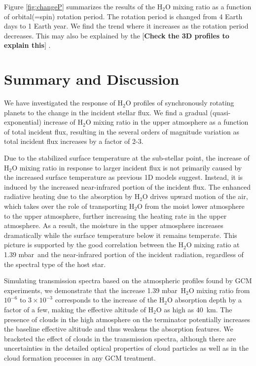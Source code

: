 \documentclass[11pt,numberedappendix,twocolappendix,]{emulateapj}
\def\water{H$_2$O }
\def\preslevel{1.39 mbar\ }
\def\memo#1{\color{red}$[${\bf #1}$]$ \color{black}}
\begin{document}
Figure \ref{fig:changeP} summarizes the results of the \water mixing ratio as a function of orbital(=spin) rotation period. 
The rotation period is changed from 4 Earth days to 1 Earth year. 
We find the trend where it increases as the rotation period decreases. 
This may also be explained by the 
\memo{Check the 3D profiles to explain this}. 



\section{Summary and Discussion}
\label{s:summary}

We have investigated the response of \water profiles of synchronously rotating planets to the change in the incident stellar flux. 
We find a gradual (quasi-exponential) increase of \water mixing ratio in the upper atmosphere as a function of total incident flux, resulting in the several orders of magnitude variation as total incident flux increases by a factor of 2-3. 

Due to the stabilized surface temperature at the sub-stellar point, the increase of \water mixing ratio in response to larger incident flux is not primarily caused by the increased surface temperature as previous 1D models suggest. 
Instead, it is induced by the increased near-infrared portion of the incident flux. 
The enhanced radiative heating due to the absorption by \water drives upward motion of the air, which takes over the role of transporting \water from the moist lower atmosphere to the upper atmosphere, further increasing the heating rate in the upper atmosphere.
As a result, the moisture in the upper atmosphere increases dramatically while the surface temperature below it remains temperate. 
This picture is supported by the good correlation between the \water mixing ratio at \preslevel and the near-infrared portion of the incident radiation, regardless of the spectral type of the host star. 

Simulating transmission spectra based on the atmospheric profiles found by GCM experiments, 
we demonstrate that the increase \preslevel \water mixing ratio from $10^{-6}$ to $3 \times 10^{-3}$ corresponds to the increase of the \water absorption depth by a factor of a few, making the effective altitude of \water as high as 40~km. 
The presence of clouds in the high atmosphere on the terminator potentially increases the baseline effective altitude and thus weakens the absorption features. 
We bracketed the effect of clouds in the transmission spectra, 
although there are uncertainties in the detailed optical properties of cloud particles as well as in the cloud formation processes in any GCM treatment. 
\end{document}
